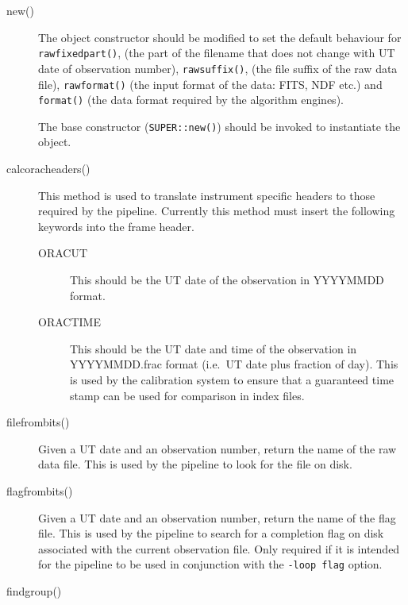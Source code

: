 \documentclass[twoside,11pt]{article}
\renewcommand{\_}{\texttt{\symbol{95}}}
\begin{document}
\begin{description}
\item[new()] \mbox{}

The object constructor should be modified to set the default behaviour
for \texttt{rawfixedpart()}, (the part of the filename that does not
change with UT date of observation number), \texttt{rawsuffix()},
(the file suffix of the raw data file),
\texttt{rawformat()} (the input format of the data: FITS, NDF etc.)
and \texttt{format()} (the data format required by the algorithm
engines).

The base constructor (\texttt{SUPER::new()}) should be invoked to
instantiate the object.

\item[calc\_orac\_headers()] \mbox{}

This method is used to translate instrument specific headers to those
required by the pipeline. Currently this method must insert the
following  keywords into the frame header.

\begin{description}
\item[ORACUT] \mbox{}

This should be the UT date of the observation in YYYYMMDD format.

\item[ORACTIME] \mbox{}

This should be the UT date and time of the observation in
YYYYMMDD.frac format (i.e.\ UT date plus fraction of day). This is
used by the calibration system to ensure that a guaranteed time stamp
can be used for comparison in index files.

\end{description}

\item[file\_from\_bits()] \mbox{}

Given a UT date  and an observation number, return the name of the 
raw data file. This is used by the pipeline to look for the file on disk.

\item[flag\_from\_bits()] \mbox{}

Given a UT date and an observation number, return the name of the flag 
file. This is used by the pipeline to search for a completion flag on
disk associated with the current observation file. Only required if 
it is intended for the pipeline to be used in conjunction with the 
\texttt{-loop flag} option.

\item[findgroup()] \mbox{}


\end{description}
\end{document}
